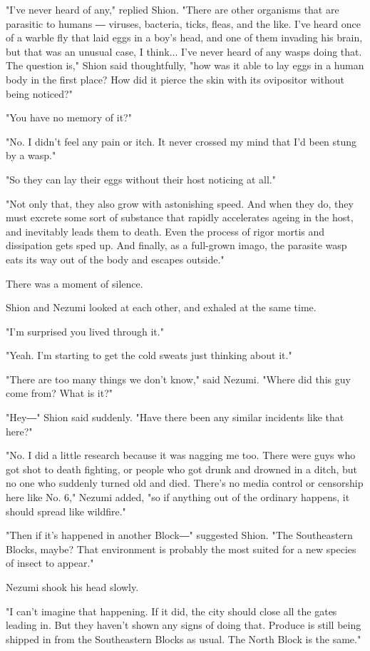 "I've never heard of any," replied Shion. "There are other organisms
that are parasitic to humans ― viruses, bacteria, ticks, fleas, and the
like. I've heard once of a warble fly that laid eggs in a boy's head,
and one of them invading his brain, but that was an unusual case, I
think... I've never heard of any wasps doing that. The question is,"
Shion said thoughtfully, "how was it able to lay eggs in a human body in
the first place? How did it pierce the skin with its ovipositor without
being noticed?"

"You have no memory of it?"

"No. I didn't feel any pain or itch. It never crossed my mind that I'd
been stung by a wasp."

"So they can lay their eggs without their host noticing at all."

"Not only that, they also grow with astonishing speed. And when they do,
they must excrete some sort of substance that rapidly accelerates ageing
in the host, and inevitably leads them to death. Even the process of
rigor mortis and dissipation gets sped up. And finally, as a full-grown
imago, the parasite wasp eats its way out of the body and escapes
outside."

There was a moment of silence.

Shion and Nezumi looked at each other, and exhaled at the same time.

"I'm surprised you lived through it."

"Yeah. I'm starting to get the cold sweats just thinking about it."

"There are too many things we don't know," said Nezumi. "Where did this
guy come from? What is it?"

"Hey―" Shion said suddenly. "Have there been any similar incidents like
that here?"

"No. I did a little research because it was nagging me too. There were
guys who got shot to death fighting, or people who got drunk and drowned
in a ditch, but no one who suddenly turned old and died. There's no
media control or censorship here like No. 6," Nezumi added, "so if
anything out of the ordinary happens, it should spread like wildfire."

"Then if it's happened in another Block―" suggested Shion. "The
Southeastern Blocks, maybe? That environment is probably the most suited
for a new species of insect to appear."

Nezumi shook his head slowly.

"I can't imagine that happening. If it did, the city should close all
the gates leading in. But they haven't shown any signs of doing that.
Produce is still being shipped in from the Southeastern Blocks as usual.
The North Block is the same."

